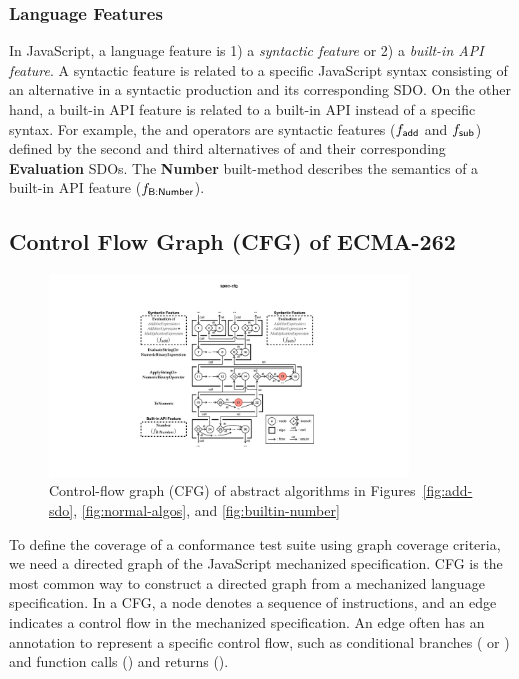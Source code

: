 
\subsubsection{Language Features}\label{sec:feat}

In JavaScript, a language feature is 1) a \textit{syntactic feature} or 2) a
\textit{built-in API feature}.
A syntactic feature is related to a specific JavaScript syntax consisting of an
alternative in a syntactic production and its corresponding SDO.
On the other hand, a built-in API feature is related to a built-in API instead
of a specific syntax.
For example, the \scode{+} and \scode{-} operators are
syntactic features ($f_{\textsf{add}}$ and $f_{\textsf{sub}}$) defined by the second and third
alternatives of  and their corresponding \textbf{Evaluation} SDOs.
The \textbf{Number} built-method describes the semantics of a built-in
 API feature ($f_{\textsf{B:Number}}$).

\subsection{Control Flow Graph (CFG) of ECMA-262}\label{sec:cfg}

\begin{figure}[t]
  \centering
  \includegraphics[width=0.85\textwidth]{img/spec-cfg}
  \caption{
    Control-flow graph (CFG) of abstract algorithms in
    Figures~\ref{fig:add-sdo}, \ref{fig:normal-algos}, and
    \ref{fig:builtin-number}
  }
  \label{fig:spec-cfg}
\end{figure}

To define the coverage of a conformance test suite using graph coverage criteria,
we need a directed graph of the JavaScript mechanized specification.
CFG is the most common way to construct a directed
graph from a mechanized language specification.
In a CFG, a node denotes a sequence of instructions, and an edge
indicates a control flow in the mechanized specification.
An edge often has an annotation to represent a specific control flow,
such as conditional branches ( or ) and function calls
() and returns ().

